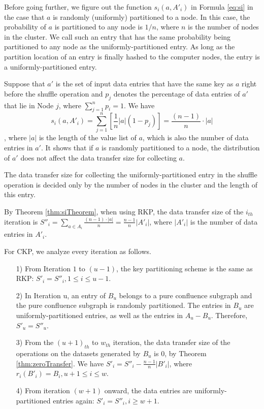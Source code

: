 \documentclass[10pt,journal,compsoc]{IEEEtran}
\begin{document}
Before going further, we figure out the function $s_i(a,A'_i)$ in Formula \ref{eq:si} in the case that $a$ is randomly (uniformly) partitioned to a node. 
In this case, the probability of $a$ is partitioned to any node is $1/n$, where $n$ is the number of nodes in the cluster. 
We call such an entry that has the same probability being partitioned to any node as the uniformly-partitioned entry. 
As long as the partition location of an entry is finally hashed to the computer nodes, the entry is a uniformly-partitioned entry.

Suppose that $a'$ is the set of input data entries that have the same key as $a$ right before the shuffle operation and $p_j$ denotes the percentage of data entries of $a'$ that lie in Node $j$, where $\sum_{j=1}^{n} p_i=1$.
We have
\begin{equation}\label{eq:si2}
s_i(a,A'_i)= \sum_{j=1}^{n} [\frac{1}{n}|a|(1-p_j)]=\frac{(n-1)} {n}\cdot |a|
\end{equation}
, where $|a|$ is the length of the value list of $a$, which is also the number of data entries in $a'$. 
It shows that if $a$ is randomly partitioned to a node, 
the distribution of $a'$ does not affect the data transfer size for collecting $a$. 

\newtheorem{siTheorem}{\textbf{Theorem}}
\begin{theorem}\label{thm:siTheorem}
The data transfer size for collecting the uniformly-partitioned entry in the shuffle operation is decided only by the number of nodes in the cluster and the length of this entry. 
\end{theorem}

By Theorem \ref{thm:siTheorem}, when using RKP, the data transfer size of the $i_{th}$ iteration is $S''_i=\sum_{a\in A_i} \frac{(n-1) \cdot |a|}{n}=\frac{n-1}{n}|A'_i|$, 
where $|A'_i|$ is the number of data entries in $A'_i$.

For CKP, we analyze every iteration as follows. 

\begin{itemize}
\setlength{\itemsep}{0pt}
\setlength{\parskip}{0pt}
\setlength{\parsep}{0pt}
\item[1)] From Iteration $1$ to $(u-1)$, the key partitioning scheme is the same as RKP: 
$S'_i=S''_i, 1 \leq i \leq u-1$. 

\item[2)] In Iteration u, an entry of $B_u$ belongs to a pure confluence subgraph and the pure confluence subgraph is randomly partitioned. 
The entries in $B_u$ are uniformly-partitioned entries, as well as the entries in $A_u-B_u$. Therefore, $S'_u=S''_u$.

\item[3)] From the $(u+1)_{th}$ to $w_{th}$ iteration, the data transfer size of the operations on the datasets generated by $B_u$
is 0, by Theorem \ref{thm:zeroTransfer}. 
We have $S'_i=S''_i-\frac{n-1}{n}|B'_i|$, 
where $r_i(B'_i)=B_i, u+1 \leq i \leq w$. 

\item[4)] From iteration $(w+1)$ onward, the data entries are uniformly-partitioned entries again:
$S'_i=S''_i, i \geq w+1$.
\end{itemize}
\end{document}

